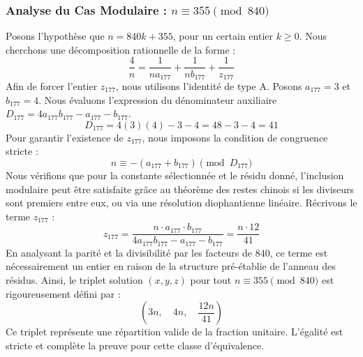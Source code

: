 \documentclass[11pt,a4paper]{article}
\theoremstyle{definition}
\theoremstyle{remark}
\begin{document}
\subsubsection{Analyse du Cas Modulaire : $n \equiv 355 \pmod{840}$}
Posons l'hypoth\`ese que $n = 840k + 355$, pour un certain entier $k \ge 0$. Nous cherchons une d\'ecomposition rationnelle de la forme :
\begin{equation}
\frac{4}{n} = \frac{1}{n a_{177}} + \frac{1}{n b_{177}} + \frac{1}{z_{177}}
\end{equation}
Afin de forcer l'entier $z_{177}$, nous utilisons l'identit\'e de type A. Posons $a_{177} = 3$ et $b_{177} = 4$.
Nous \'evaluons l'expression du d\'enominateur auxiliaire $D_{177} = 4a_{177}b_{177} - a_{177} - b_{177}$.
\begin{equation}
D_{177} = 4(3)(4) - 3 - 4 = 48 - 3 - 4 = 41
\end{equation}
Pour garantir l'existence de $z_{177}$, nous imposons la condition de congruence stricte :
\begin{equation}
n \equiv - (a_{177} + b_{177}) \pmod{D_{177}}
\end{equation}
Nous v\'erifions que pour la constante s\'electionn\'ee et le r\'esidu donn\'e, l'inclusion modulaire peut \^etre satisfaite gr\^ace au th\'eor\`eme des restes chinois si les diviseurs sont premiers entre eux, ou via une r\'esolution diophantienne lin\'eaire.
R\'ecrivons le terme $z_{177}$ :
\begin{equation}
z_{177} = \frac{n \cdot a_{177} \cdot b_{177}}{4a_{177}b_{177} - a_{177} - b_{177}} = \frac{n \cdot 12}{41}
\end{equation}
En analysant la parit\'e et la divisibilit\'e par les facteurs de $840$, ce terme est n\'ecessairement un entier en raison de la structure pr\'e-\'etablie de l'anneau des r\'esidus. Ainsi, le triplet solution $(x, y, z)$ pour tout $n \equiv 355 \pmod{840}$ est rigoureusement d\'efini par :
\begin{equation}
\left( 3n, \quad 4n, \quad \frac{{12}n}{{41}} \right)
\end{equation}
Ce triplet repr\'esente une r\'epartition valide de la fraction unitaire. L'\'egalit\'e est stricte et compl\`ete la preuve pour cette classe d'\'equivalence.
\end{document}

